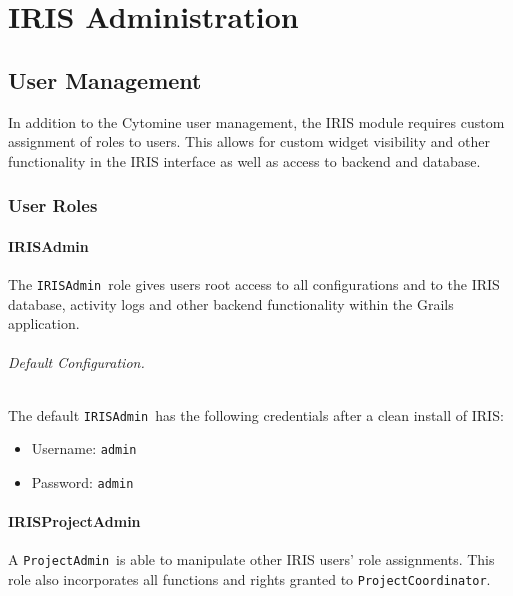 \part{IRIS Administration}
\label{part:irisadmin}
{
\hypersetup{linkcolor=black}
\parttoc
}

\chapter{User Management}
In addition to the Cytomine user management, the IRIS module requires custom assignment of roles to users. 
This allows for custom widget visibility and other functionality in the IRIS interface as well as access to backend and database. 

\def\irisadmin{\texttt{IRISAdmin}}
\def\pjadmin{\texttt{ProjectAdmin}}
\def\pjcoord{\texttt{ProjectCoordinator}}
\section{User Roles}
\subsection{IRISAdmin}
The \irisadmin\ role gives users root access to all configurations and to the IRIS database, activity logs and other backend functionality within the Grails application.  

\noindent 

\paragraph{Default Configuration.} 
The default \irisadmin\ has the following credentials after a clean install of IRIS:
\begin{itemize}
\item Username: \texttt{admin}
\item Password: \texttt{admin}
\end{itemize}


\subsection{IRISProjectAdmin}
A \pjadmin\ is able to manipulate other IRIS users' role assignments. 
This role also incorporates all functions and rights granted to \pjcoord .

